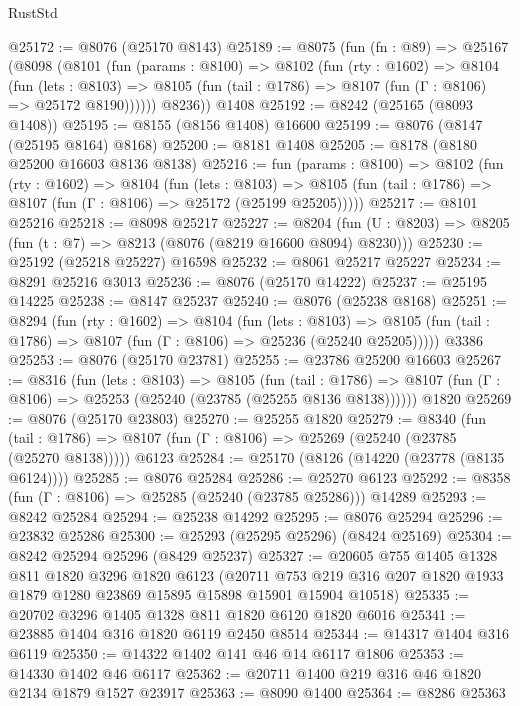 \begin{lexlean}{RustStd}
\begin{coremodule}
@25172 := @8076 (@25170 @8143)
@25189 := @8075
    (fun (fn : @89) =>
    @25167
      (@8098
        (@8101
          (fun (params : @8100) =>
          @8102
            (fun (rty : @1602) =>
            @8104
              (fun (lets : @8103) =>
              @8105 (fun (tail : @1786) => @8107 (fun (Γ : @8106) => @25172 @8190))))))
        @8236))
    @1408
@25192 := @8242 (@25165 (@8093 @1408))
@25195 := @8155 (@8156 @1408) @16600
@25199 := @8076 (@8147 (@25195 @8164) @8168)
@25200 := @8181 @1408
@25205 := @8178 (@8180 @25200 @16603 @8136 @8138)
@25216 := fun (params : @8100) =>
  @8102
    (fun (rty : @1602) =>
    @8104
      (fun (lets : @8103) =>
      @8105 (fun (tail : @1786) => @8107 (fun (Γ : @8106) => @25172 (@25199 @25205)))))
@25217 := @8101 @25216
@25218 := @8098 @25217
@25227 := @8204
    (fun (U : @8203) => @8205 (fun (t : @7) => @8213 (@8076 (@8219 @16600 @8094) @8230)))
@25230 := @25192 (@25218 @25227) @16598
@25232 := @8061 @25217 @25227
@25234 := @8291 @25216 @3013
@25236 := @8076 (@25170 @14222)
@25237 := @25195 @14225
@25238 := @8147 @25237
@25240 := @8076 (@25238 @8168)
@25251 := @8294
    (fun (rty : @1602) =>
    @8104
      (fun (lets : @8103) =>
      @8105 (fun (tail : @1786) => @8107 (fun (Γ : @8106) => @25236 (@25240 @25205)))))
    @3386
@25253 := @8076 (@25170 @23781)
@25255 := @23786 @25200 @16603
@25267 := @8316
    (fun (lets : @8103) =>
    @8105
      (fun (tail : @1786) =>
      @8107 (fun (Γ : @8106) => @25253 (@25240 (@23785 (@25255 @8136 @8138))))))
    @1820
@25269 := @8076 (@25170 @23803)
@25270 := @25255 @1820
@25279 := @8340
    (fun (tail : @1786) => @8107 (fun (Γ : @8106) => @25269 (@25240 (@23785 (@25270 @8138)))))
    @6123
@25284 := @25170 (@8126 (@14220 (@23778 (@8135 @6124))))
@25285 := @8076 @25284
@25286 := @25270 @6123
@25292 := @8358 (fun (Γ : @8106) => @25285 (@25240 (@23785 @25286))) @14289
@25293 := @8242 @25284
@25294 := @25238 @14292
@25295 := @8076 @25294
@25296 := @23832 @25286
@25300 := @25293 (@25295 @25296) (@8424 @25169)
@25304 := @8242 @25294 @25296 (@8429 @25237)
@25327 := @20605
    @755
    @1405
    @1328
    @811
    @1820
    @3296
    @1820
    @6123
    (@20711 @753 @219 @316 @207 @1820 @1933 @1879 @1280 @23869 @15895 @15898 @15901 @15904 @10518)
@25335 := @20702 @3296 @1405 @1328 @811 @1820 @6120 @1820 @6016
@25341 := @23885 @1404 @316 @1820 @6119 @2450 @8514
@25344 := @14317 @1404 @316 @6119
@25350 := @14322 @1402 @141 @46 @14 @6117 @1806
@25353 := @14330 @1402 @46 @6117
@25362 := @20711 @1400 @219 @316 @46 @1820 @2134 @1879 @1527 @23917
@25363 := @8090 @1400
@25364 := @8286 @25363

\end{coremodule}
\end{lexlean}
